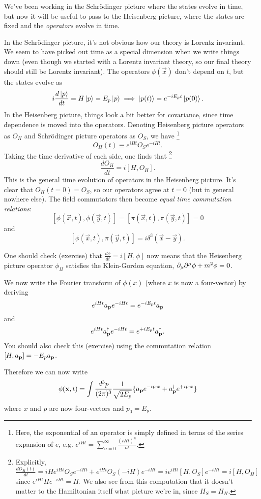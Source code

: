 We've been working in the Schr\"odinger picture where the states evolve in time, but now it will be useful to pass to the Heisenberg picture, where the states are fixed and the \emph{operators} evolve in time.

In the Schr\"odinger picture, it's not obvious how our theory is Lorentz invariant. We seem to have picked out time as a special dimension when we write things down (even though we started with a Lorentz invariant theory, so our final theory should still be Lorentz invariant). The operators $\phi(\vec x)$ don't depend on $t$, but the states evolve as
$$i \frac{d\left| p \right>}{dt}=H\left| p \right> = E_p\left| p \right> \implies \left| p(t) \right>= e^{-i E_pt} \left| p(0) \right>.$$
In the Heisenberg picture, things look a bit better for covariance, since time dependence is moved into the operators. Denoting Heisenberg picture operators as $O_H$ and Schr\"odinger picture operators as $O_S$, we have%
    \footnote{Here, the exponential of an operator is simply defined in terms of the series expansion of $e$, e.g. $e^{iHt}=\sum_{n=0}^\infty \frac{(iHt)^n}{n!}$.}
$$O_H(t) \equiv e^{iHt}O_S e^{-iHt}.$$
Taking the time derivative of each side, one finds that%
    \footnote{Explicitly, $\frac{d O_H(t)}{dt}= iH e^{iHt} O_S e^{-iHt}+e^{iHt}O_S (-iH) e^{-iHt} = i e^{iHt} [H,O_S] e^{-iHt} = i[H,O_H]$ since $e^{iHt}H e^{-iHt}=H$. We also see from this computation that it doesn't matter to the Hamiltonian itself what picture we're in, since $H_S=H_H$.}
$$\frac{dO_H}{dt}=i[H,O_H].$$
This is the general time evolution of operators in the Heisenberg picture. It's clear that $O_H(t=0)=O_S$, so our operators agree at $t=0$ (but in general nowhere else). The field commutators then become \emph{equal time commutation relations}:
$$[\phi(\vec x,t),\phi(\vec y, t)]=[\pi(\vec x, t), \pi(\vec y,t)]=0$$
and
$$[\phi(\vec x, t), \pi (\vec y, t)]=i \delta^3(\vec x-\vec y).$$

\begin{ex}\label{heisenbergkleingordon}
One should check (exercise) that $\frac{d\phi}{dt}=i[H,\phi]$ now means that the Heisenberg picture operator $\phi_H$ satisfies the Klein-Gordon equation, $\partial_\mu \partial^\mu \phi+ m^2 \phi=0$.
\end{ex}
We now write the Fourier transform of $\phi(x)$ (where $x$ is now a four-vector) by deriving
$$e^{iHt}a_{\boldsymbol{\mathbf{p}}} e^{-iHt}=e^{-iE_p t} a_{\boldsymbol{\mathbf{p}}}$$
and
$$e^{iHt}a_{\boldsymbol{\mathbf{p}}}^\dagger e^{-iHt}=e^{+iE_p t} a_{\boldsymbol{\mathbf{p}}}^\dagger.$$
You should also check this (exercise) using the commutation relation $[H,a_{\boldsymbol{\mathbf{p}}}]=-E_p a_{\boldsymbol{\mathbf{p}}}$.

Therefore we can now write
$$\phi(\boldsymbol{\mathbf{x}}, t)=\int \frac{d^3p}{(2\pi)^3} \frac{1}{\sqrt{2E_p}} \{ a_{\boldsymbol{\mathbf{p}}} e^{-i p\cdot x}+a_{\boldsymbol{\mathbf{p}}}^\dagger e^{+i p\cdot x}\}$$
where $x$ and $p$ are now four-vectors and $p_0= E_p$.

